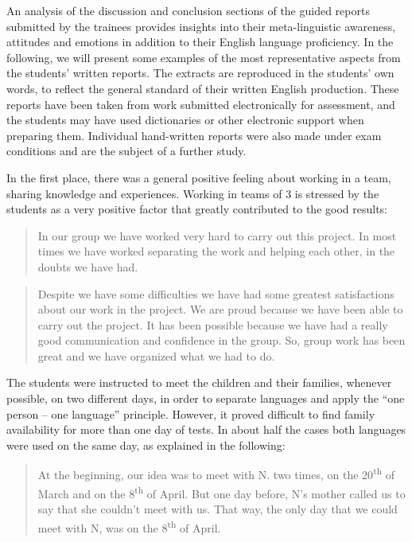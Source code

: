 \documentclass[output=paper]{../langscibook}
\begin{document}
An analysis of the discussion and conclusion sections of the guided reports submitted by the trainees provides insights into their meta-linguistic awareness, attitudes and emotions in addition to their English language proficiency. In the following, we will present some examples of the most representative aspects from the students’ written reports. The extracts are reproduced in the students' own words, to reflect the general standard of their written English production. These reports have been taken from work submitted electronically for assessment, and the students may have used dictionaries or other electronic support when preparing them. Individual hand-written reports were also made under exam conditions and are the subject of a further study.




In the first place, there was a general positive feeling about working in a team, sharing knowledge and experiences. Working in teams of 3 is stressed by the students as a very positive factor that greatly contributed to the good results:

\begin{quote}
 In our group we have worked very hard to carry out this project. In most times we have worked separating the work and helping each other, in the doubts we have had.
\end{quote}

\begin{quote}
Despite we have some difficulties we have had some greatest satisfactions about our work in the project. We are proud because we have been able to carry out the project. It has been possible because we have had a really good communication and confidence in the group. So, group work has been great and we have organized what we had to do. 
\end{quote}

The students were instructed to meet the children and their families, whenever possible, on two different days, in order to separate languages and apply the “one person – one language” principle. However, it proved difficult to find family availability for more than one day of tests. In about half the cases both languages were used on the same day, as explained in the following:

\begin{quote}
At the beginning, our idea was to meet with N. two times, on the 20\textsuperscript{th} of March and on the 8\textsuperscript{th} of April. But one day before, N’s mother called us to say that she couldn’t meet with us. That way, the only day that we could meet with N, was on the 8\textsuperscript{th} of April.
\end{quote}
\end{document}
